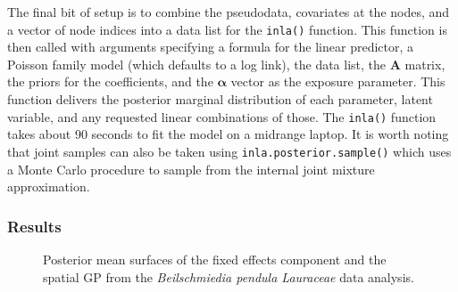 \documentclass{interact}
\begin{document}
The final bit of setup is to combine the pseudodata, covariates at the nodes,
and a vector of node indices into a data list for the \texttt{inla()} function.
This function is then called with arguments specifying a formula for the
linear predictor, a Poisson family model (which defaults to a log link), the
data list, the \(\mathbf{A}\) matrix, the priors for the coefficients, and the
\(\boldsymbol{\alpha}\) vector as the exposure parameter. This function
delivers the posterior marginal distribution of each parameter, latent
variable, and any requested linear combinations of those. The \texttt{inla()} function takes about 90 seconds to fit the model on a midrange laptop. It is worth noting that joint samples can also be taken using \texttt{inla.posterior.sample()} which uses a Monte Carlo procedure to sample from the internal joint mixture approximation.

\subsubsection{Results}
\label{beiresults}

\begin{figure}[t!]\centering



\caption{Posterior mean surfaces of the fixed effects component and the
spatial GP from the \emph{Beilschmiedia pendula Lauraceae} data analysis.}
\label{beimean}
\end{figure}
\end{document}
